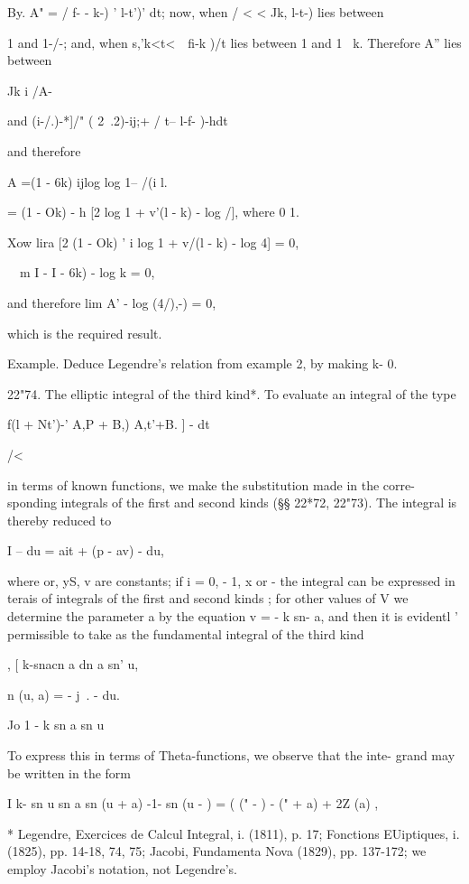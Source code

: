 By. A" = / f- - k-) ' l-t')' dt; now, when / < < Jk, l-t-)
lies between

1 and 1-/-; and, when s,'k<t<\ \ fi-k )/t lies between 1 and 1 ~k.
Therefore A'' lies between

Jk i /A-

and (i-/.)-*]/" ( 2\ .2)-ij;+ / t-- l-f- )-hdt\;

and therefore

A =(1 - 6k) ijlog log 1-- /(i l.

= (1 - Ok) - h [2 log 1 + v'(l - k) - log /], where 0 1.

Xow lira [2 (1 - Ok) ' i log 1 + v/(l - k) - log 4] = 0,

\ \ m I - I - 6k) - log k = 0,

and therefore lim A' - log (4/),-) = 0,

which is the required result.

Example. Deduce Legendre's relation from example 2, by making
k- 0.

22"74. The elliptic integral of the third kind*. To evaluate an
integral of the type

f(l + Nt')-' A,P + B,) A,t'+B. ] - dt

/<

in terms of known functions, we make the substitution made in the
corre- sponding integrals of the first and second kinds (§§ 22*72,
22"73). The integral is thereby reduced to

I -- du = ait + (p - av) - du,

where or, yS, v are constants; if i = 0, - 1, x or - the integral
can be expressed in terais of integrals of the first and second kinds
; for other values of V we determine the parameter a by the equation v
= - k sn- a, and then it is evidentl ' permissible to take as the
fundamental integral of the third kind

, [ k-snacn a dn a sn' u,

n (u, a) = - j~. - du.

  Jo 1 - k sn a sn u

To express this in terms of Theta-functions, we observe that the inte-
grand may be written in the form

I k- sn u sn a sn (u + a) -1- sn (u - ) = ( (" - ) - (" + a) + 2Z (a)
,

* Legendre, Exercices de Calcul Integral, i. (1811), p. 17; Fonctions
EUiptiques, i. (1825), pp. 14-18, 74, 75; Jacobi, Fundamenta Nova
(1829), pp. 137-172; we employ Jacobi's notation, not Legendre's.

